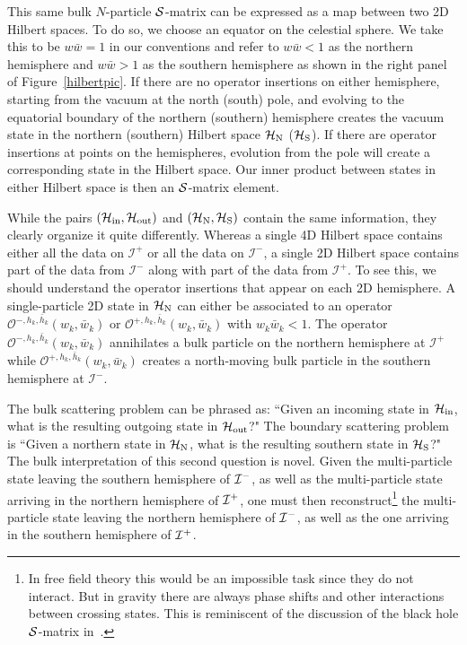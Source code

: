 \documentclass[11pt]{article}
\def\ch{\cal{H}}
\def\ci{\cal{I}}
\numberwithin{equation}{section}
\begin{document}
This same bulk $N$-particle $\cal S$-matrix can be expressed as a map between two 2D Hilbert spaces. To do so, we choose an equator on the celestial sphere. We take this to be  $w\bar w=1$ in our conventions and refer to $w \bar w<1$ as the northern hemisphere and $w \bar w >1 $ as the southern hemisphere as shown in the right panel of Figure~\ref{hilbertpic}. If there are no operator insertions on either hemisphere, starting from the vacuum at the north (south) pole, and evolving to the equatorial boundary of the northern (southern) hemisphere creates the vacuum state in the northern (southern) Hilbert space $\ch_{\rm N}$ ($\ch_{\rm S}$). If there are operator insertions at points on the hemispheres, evolution from the pole will create a corresponding state in the Hilbert space. Our inner product between states in either Hilbert space is then an $\cal S$-matrix element.

While the pairs $(\ch_{\rm in},\ch_{\rm out})$ and $(\ch_{\rm N},\ch_{\rm S})$ contain the same information, they clearly organize it quite differently. Whereas a single 4D Hilbert space contains either all the data on $\mathcal{I}^+$ or all the data on $\mathcal{I}^-$, a single 2D Hilbert space contains part of the data from $\mathcal{I}^-$ along with part of the data from $\mathcal{I}^+$. To see this, we should understand the operator insertions that appear on each 2D hemisphere. A single-particle 2D state in $\ch_{\rm N}$ can either be associated to an operator ${\mathcal{O}}^{ -, h_k,\bar{h}_k}(w_k, \bar w_k)$ or ${\mathcal{O}}^{ +, h_k,\bar{h}_k}(w_k, \bar w_k)$ with $w_k\bar w_k<1$. The operator ${\mathcal{O}}^{ -, h_k,\bar{h}_k}(w_k, \bar w_k)$ annihilates a bulk particle  on the northern hemisphere at $\mathcal{I}^+$ while ${\mathcal{O}}^{ +, h_k,\bar{h}_k}(w_k, \bar w_k)$ creates a north-moving bulk particle in the southern hemisphere at $\mathcal{I}^-$.

The bulk scattering problem can be phrased as: ``Given an incoming state in $\ch_{\rm in}$, what is the resulting outgoing state in $\ch_{\rm out}$?" The boundary scattering problem is ``Given a northern  state in $\ch_{\rm N}$, what is the resulting southern  state in $\ch_{\rm S}$?" The bulk interpretation of this second question is novel. Given the multi-particle state leaving the southern hemisphere of $\ci^-$, as well as the multi-particle state arriving in the northern hemisphere of $\ci^+$,  one must then reconstruct\footnote{In free field theory this would be an impossible task since they do not interact. But in gravity there are always phase shifts and other interactions between crossing states. This is reminiscent of the discussion of the black hole $\cal S$-matrix in~\cite{tHooft:1996rdg}.} the multi-particle state leaving the northern hemisphere of $\ci^-$, as well as the one arriving in the southern hemisphere of $\ci^+$. 
\end{document}
